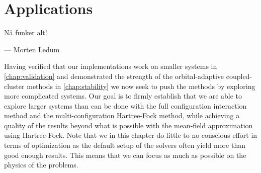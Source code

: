\chapter{Applications}
    \epigraph{Nå funker alt!}
    {--- Morten Ledum}

    Having verified that our implementations work on smaller systems in
    \autoref{chap:validation} and demonstrated the strength of the
    orbital-adaptive coupled-cluster methods in \autoref{chap:stability} we now
    seek to push the methods by exploring more complicated systems.
    Our goal is to firmly establish that we are able to explore larger systems
    than can be done with the full configuration interaction method and the
    multi-configuration Hartree-Fock method, while achieving a quality of the
    results beyond what is possible with the mean-field approximation using
    Hartree-Fock.
    Note that we in this chapter do little to no conscious effort in terms of
    optimization as the default setup of the solvers often yield more than good
    enough results.
    This means that we can focus as much as possible on the physics of the
    problems.

